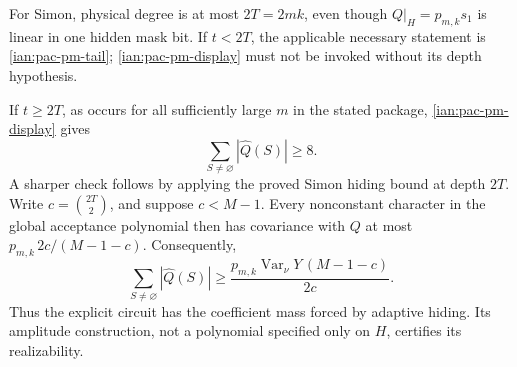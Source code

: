 \begin{remark}
\label{ian:pac-simon-pm}
For Simon, physical degree is at most \(2T=2mk\), even though
\(Q|_H=p_{m,k}s_1\) is linear in one hidden mask bit.
If \(t<2T\), the applicable necessary statement is
\eqref{ian:pac-pm-tail}; \eqref{ian:pac-pm-display} must not be invoked without its
depth hypothesis.

If \(t\ge2T\), as occurs for all sufficiently large \(m\) in the
stated package, \eqref{ian:pac-pm-display} gives
\[
 \sum_{S\ne\varnothing}|\widehat Q(S)|\ge8.
\]
A sharper check follows by applying the proved Simon hiding bound
at depth \(2T\). Write \(c=\binom{2T}{2}\), and suppose \(c<M-1\).
Every nonconstant character in the global acceptance polynomial
then has covariance with \(Q\) at most
\(p_{m,k}\,2c/(M-1-c)\). Consequently,
\[
 \sum_{S\ne\varnothing}|\widehat Q(S)|
 \ge
 \frac{
 p_{m,k}\operatorname{Var}_\nu Y\,(M-1-c)
 }{2c}.
\]
Thus the explicit circuit has the coefficient mass forced by
adaptive hiding. Its amplitude construction, not a polynomial
specified only on \(H\), certifies its realizability.
\end{remark}
